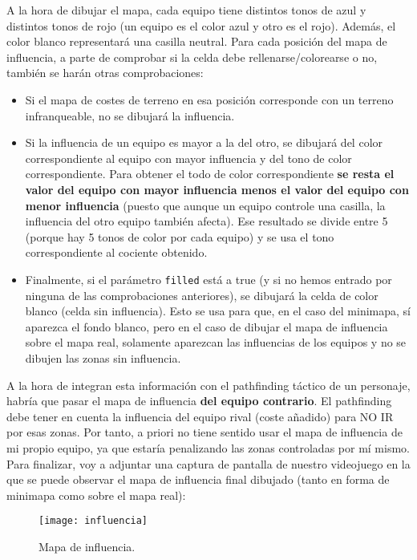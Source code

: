 A la hora de dibujar el mapa, cada equipo tiene distintos tonos de azul y distintos tonos de rojo (un equipo es el color azul y otro es el rojo). Además, el color blanco representará una casilla neutral. Para cada posición del mapa de influencia, a parte de comprobar si la celda debe rellenarse/colorearse o no, también se harán otras comprobaciones:
\begin{itemize}
	\item Si el mapa de costes de terreno en esa posición corresponde con un terreno infranqueable, no se dibujará la influencia.
	\item Si la influencia de un equipo es mayor a la del otro, se dibujará del color correspondiente al equipo con mayor influencia y del tono de color correspondiente. Para obtener el todo de color correspondiente \textbf{se resta el valor del equipo con mayor influencia menos el valor del equipo con menor influencia} (puesto que aunque un equipo controle una casilla, la influencia del otro equipo también afecta). Ese resultado se divide entre 5 (porque hay 5 tonos de color por cada equipo) y se usa el tono correspondiente al cociente obtenido.
	\item Finalmente, si el parámetro \texttt{filled} está a true (y si no hemos entrado por ninguna de las comprobaciones anteriores), se dibujará la celda de color blanco (celda sin influencia). Esto se usa para que, en el caso del minimapa, sí aparezca el fondo blanco, pero en el caso de dibujar el mapa de influencia sobre el mapa real, solamente aparezcan las influencias de los equipos y no se dibujen las zonas sin influencia.
\end{itemize}

A la hora de integran esta información con el pathfinding táctico de un personaje, habría que pasar el mapa de influencia \textbf{del equipo contrario}. El pathfinding debe tener en cuenta la influencia del equipo rival (coste añadido) para NO IR por esas zonas. Por tanto, a priori no tiene sentido usar el mapa de influencia de mi propio equipo, ya que estaría penalizando las zonas controladas por mí mismo. \\

Para finalizar, voy a adjuntar una captura de pantalla de nuestro videojuego en la que se puede observar el mapa de influencia final dibujado (tanto en forma de minimapa como sobre el mapa real):
\begin{figure}[!th]
\texttt{[image: influencia]}
\centering
\caption{Mapa de influencia.}
\label{mapa:mapa}
\end{figure}
